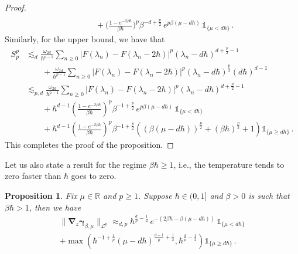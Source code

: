 \documentclass[11pt]{amsart}
\theoremstyle{plain}
\newtheorem{prop}[theorem]{Proposition}
\theoremstyle{definition}
\newcommand		{\RR}		{\mathbb R}			%
\newcommand		{\R}		{\RR}
\newcommand		{\cL}		{\mathcal L}		%
\newcommand		{\lt}			{\left}				%
\newcommand		{\rt}			{\right}			%
\renewcommand	{\(}			{\lt(}
\renewcommand	{\)}			{\rt)}
\newcommand		{\n}[1]			{\lt\lvert #1 \rt\rvert}
\newcommand		{\bnrm}[1]		{\big\lVert #1\big\rVert}	%
\newcommand		{\bNrm}[2]		{\bnrm{#1}_{#2}}
\newcommand		{\indic}	{\mathds{1}}		%
\newcommand		{\opgam}	{{\boldsymbol{\gamma}}}	%
\newcommand		{\Dh}		{\boldsymbol{\nabla}}	%
\newcommand		{\Dhz}[1]	{\Dh_{\!z} #1}
\begin{document}
\begin{proof}
\begin{align*}
			\\
			&\qquad\ + \biggl(\frac{1-e^{-2\beta\hbar}}{\beta\hbar}\biggr)^p \beta^{-d+\frac{p}{2}} \, e^{p\beta (\mu-d\hbar)} \, \indic_{\{\mu < d\hbar\}} \,.
		\end{align*}
		Similarly, for the upper bound, we have that
		\begin{align*}
			S_p^p &\lesssim_d \frac{\omega_{2d}}{\hbar^{p-1}}\sum_{n\geq 0} \n{F(\lambda_n) - F(\lambda_n-2\hbar)}^p \lt(\lambda_n-d\hbar\rt)^{d+\frac{p}{2}-1}
			\\
			&\qquad +\frac{\omega_{2d}}{\hbar^{p-1}}\sum_{n\geq 0} \n{F(\lambda_n) - F(\lambda_n-2\hbar)}^p \lt(\lambda_n-d\hbar\rt)^{\frac{p}{2}} (d\hbar)^{d-1}
			\\
			&\lesssim_{p, d} \frac{\omega_{2d}}{\hbar^{p-1}}\sum_{n\geq 0} \n{F(\lambda_n) - F(\lambda_n-2\hbar)}^p \lt(\lambda_n-d\hbar\rt)^{d+\frac{p}{2}-1}
			\\
			&\qquad+ \hbar^{d-1} \lt(\frac{1-e^{-2\beta\hbar}}{\beta\hbar}\rt)^p \beta^{-1+\frac{p}{2}} \, e^{p\beta (\mu-d\hbar)} \, \indic_{\{\mu < d\hbar\}}
			\\
			&\qquad +\hbar^{d-1} \lt(\frac{1-e^{-2\beta\hbar}}{\beta\hbar}\rt)^p \beta^{-1+\frac{p}{2}}  \lt(\lt(\beta\lt(\mu-d\hbar\rt)\rt)^{\frac{p}{2}}+(\beta\hbar)^{\frac{p}{2}}+1\rt) \indic_{\{\mu \ge d\hbar\}}\,. 
		\end{align*}
		This completes the proof of the proposition.
	\end{proof}
	
	Let us also state a result for the regime $\beta\hbar \ge 1$, i.e., the temperature tends to zero faster than $\hbar$ goes to zero. 
	
	\begin{prop}\label{prop:lower_temp_comm-est}
		Fix $\mu\in \R$ and $p\ge 1$. Suppose $\hbar \in (0, 1]$ and $\beta>0$ is such that $\beta\hbar> 1$, then we have
		\begin{multline}
			\bNrm{ \Dhz \opgam_{\beta, \mu} }{\cL^p}
			\approx_{d, p} \hbar^{\frac{d}{p}-\frac{1}{2}} \, e^{-\lt(2\beta\hbar-\beta\lt(\mu-d\hbar\rt)\rt)} \, \indic_{\{\mu < d\hbar\}}
			\\
			+ \max(\hbar^{-1+\frac{1}{p}} \lt(\mu-d\hbar\rt)^{\frac{d-1}{p}+\frac{1}{2}}, \hbar^{\frac{d}{p}-\frac12}) \indic_{\{\mu \ge d\hbar\}}\,.
		\end{multline} 
	\end{prop}
	
\end{document}
